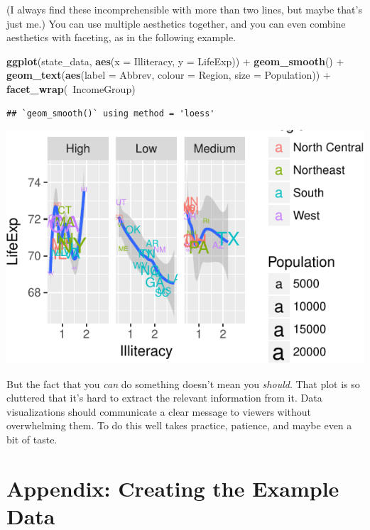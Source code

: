 \documentclass[12pt,oneside,openany]{tufte-book}
\newenvironment{Shaded}{}{}
\newcommand{\KeywordTok}[1]{\textcolor[rgb]{0.00,0.44,0.13}{\textbf{{#1}}}}
\newcommand{\DataTypeTok}[1]{\textcolor[rgb]{0.56,0.13,0.00}{{#1}}}
\newcommand{\StringTok}[1]{\textcolor[rgb]{0.25,0.44,0.63}{{#1}}}
\newcommand{\NormalTok}[1]{{#1}}
\begin{document}
(I always find these incomprehensible with more than two lines, but
maybe that's just me.) You can use multiple aesthetics together, and you
can even combine aesthetics with faceting, as in the following example.

\begin{Shaded}
\begin{Highlighting}[]
\KeywordTok{ggplot}\NormalTok{(state_data, }\KeywordTok{aes}\NormalTok{(}\DataTypeTok{x =} \NormalTok{Illiteracy, }\DataTypeTok{y =} \NormalTok{LifeExp)) +}\StringTok{ }
\StringTok{    }\KeywordTok{geom_smooth}\NormalTok{() +}\StringTok{ }\KeywordTok{geom_text}\NormalTok{(}\KeywordTok{aes}\NormalTok{(}\DataTypeTok{label =} \NormalTok{Abbrev, }
    \DataTypeTok{colour =} \NormalTok{Region, }\DataTypeTok{size =} \NormalTok{Population)) +}\StringTok{ }\KeywordTok{facet_wrap}\NormalTok{(~IncomeGroup)}
\end{Highlighting}
\end{Shaded}

\begin{verbatim}
## `geom_smooth()` using method = 'loess'
\end{verbatim}

\includegraphics{pdaps_files/figure-latex/too-many-things-1}

But the fact that you \emph{can} do something doesn't mean you
\emph{should}. That plot is so cluttered that it's hard to extract the
relevant information from it. Data visualizations should communicate a
clear message to viewers without overwhelming them. To do this well
takes practice, patience, and maybe even a bit of taste.

\section{Appendix: Creating the Example
Data}\label{appendix-creating-the-example-data-1}
\end{document}
